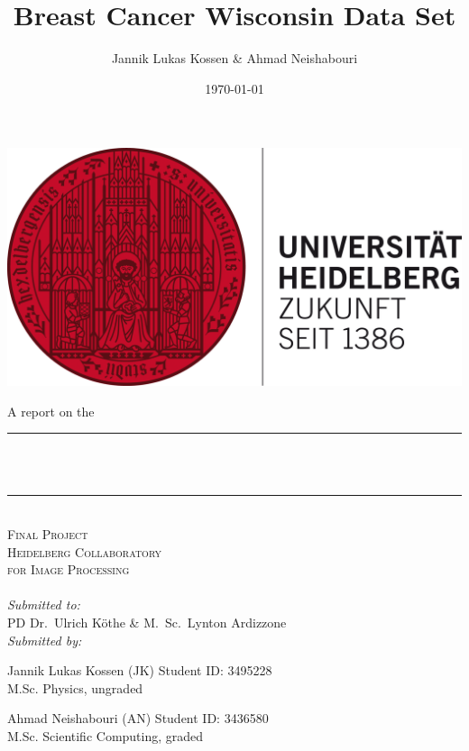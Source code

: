 \documentclass[12pt, a4paper]{scrartcl}
\title{Breast Cancer Wisconsin Data Set} %
\author{Jannik Lukas Kossen \& Ahmad Neishabouri}                               %
\date{\today}                                         %
\makeatletter
\let\thetitle\@title
\let\thedate\@date
\makeatother
\begin{document}

\begin{titlepage}
    \centering
    \includegraphics[scale = 0.6]{hdlogo}\\[2.0 cm]  %
     \begin{flushleft}
     \large  \hspace{1cm} A report on the 
	\end{flushleft}      
     \centering
    \rule{\linewidth}{0.2 mm} \\[0.4 cm]
    { \huge \bfseries \thetitle}\\
    \rule{\linewidth}{0.2 mm} \\[1.5 cm]
    
    \textsc{\LARGE Final Project}\\[0.5 cm]               %
    \textsc{\Large Heidelberg Collaboratory \\[0.5em] for Image Processing}\\[2.0 cm]  %
    \thedate
   	\\[3em]
    \large
            \emph{Submitted to:}\\[1em]
            PD Dr.\ Ulrich Köthe \& M.\ Sc.\ Lynton Ardizzone\\[1cm]
            \emph{Submitted by:} \\[1.5em]
            \begin{minipage}{0.4\textwidth}            
            	\begin{flushleft} 
					\large Jannik Lukas Kossen (JK) Student ID: 3495228 \\
					\small M.Sc. Physics, ungraded\\
      		  \end{flushleft}
      		 \end{minipage}
            \begin{minipage}{0.4\textwidth}            
            	\begin{flushright} 
    	    	    \large Ahmad Neishabouri (AN) Student ID: 3436580 \\ 
         	   		\small M.Sc. Scientific Computing, graded
      		  \end{flushright}
      		 \end{minipage}\\[2 cm]


        
 
\end{titlepage}
\end{document}
